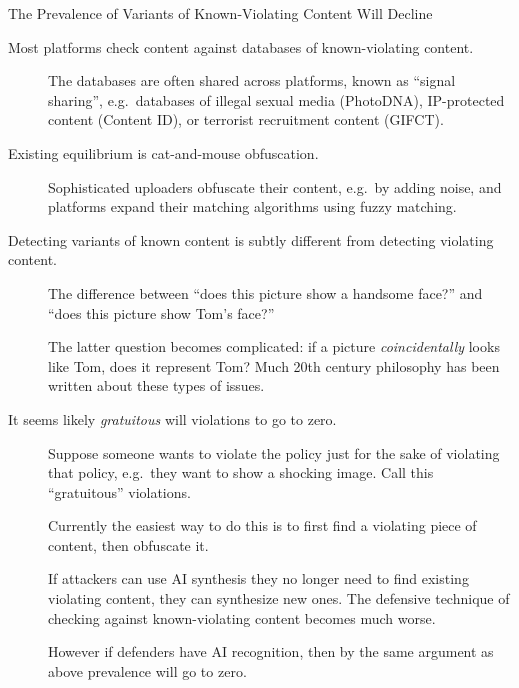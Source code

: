 \documentclass[
  10pt,
  ignorenonframetext,
]{beamer}
\begin{document}
\begin{frame}{The Prevalence of Variants of Known-Violating Content Will
Decline}
\label{the-prevalence-of-variants-of-known-violating-content-will-decline}
\begin{description}
\item[Most platforms check content against databases of known-violating
content.]
The databases are often shared across platforms, known as ``signal
sharing'', e.g.~databases of illegal sexual media (PhotoDNA),
IP-protected content (Content ID), or terrorist recruitment content
(GIFCT).
\item[Existing equilibrium is cat-and-mouse obfuscation.]
Sophisticated uploaders obfuscate their content, e.g.~by adding noise,
and platforms expand their matching algorithms using fuzzy matching.
\item[Detecting variants of known content is subtly different from
detecting violating content.]
The difference between ``does this picture show a handsome face?'' and
``does this picture show Tom's face?''

The latter question becomes complicated: if a picture
\emph{coincidentally} looks like Tom, does it represent Tom? Much 20th
century philosophy has been written about these types of issues.
\end{description}
\end{frame}

\begin{frame}{}
\label{section-9}
\begin{description}
\item[It seems likely \emph{gratuitous} will violations to go to zero.]
Suppose someone wants to violate the policy just for the sake of
violating that policy, e.g.~they want to show a shocking image. Call
this ``gratuitous'' violations.

Currently the easiest way to do this is to first find a violating piece
of content, then obfuscate it.

If attackers can use AI synthesis they no longer need to find existing
violating content, they can synthesize new ones. The defensive technique
of checking against known-violating content becomes much worse.

However if defenders have AI recognition, then by the same argument as
above prevalence will go to zero.
\end{description}
\end{frame}
\end{document}
